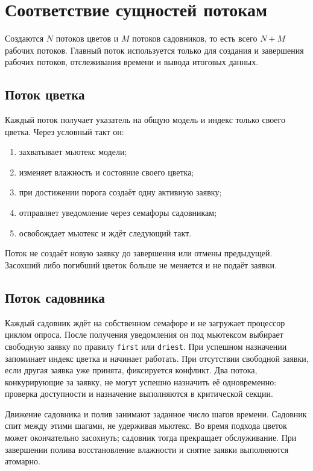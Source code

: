 \documentclass[12pt,a4paper]{article}
\begin{document}
\section{Соответствие сущностей потокам}

Создаются \(N\) потоков цветов и \(M\) потоков садовников, то есть всего
\(N+M\) рабочих потоков. Главный поток используется только для
создания и завершения рабочих потоков, отслеживания времени и вывода
итоговых данных.

\subsection{Поток цветка}

Каждый поток получает указатель на общую модель и индекс только
своего цветка. Через условный такт он:
\begin{enumerate}[noitemsep]
\item захватывает мьютекс модели;
\item изменяет влажность и состояние своего цветка;
\item при достижении порога создаёт одну активную заявку;
\item отправляет уведомление через семафоры садовникам;
\item освобождает мьютекс и ждёт следующий такт.
\end{enumerate}

Поток не создаёт новую заявку до завершения или отмены предыдущей.
Засохший либо погибший цветок больше не меняется и не подаёт заявки.

\subsection{Поток садовника}

Каждый садовник ждёт на собственном семафоре и не загружает процессор
циклом опроса. После получения уведомления он под мьютексом выбирает
свободную заявку по правилу \texttt{first} или \texttt{driest}.
При успешном назначении запоминает индекс цветка и начинает работать.
При отсутствии свободной заявки, если другая заявка уже принята,
фиксируется конфликт. Два потока, конкурирующие за заявку, не могут
успешно назначить её одновременно: проверка доступности и назначение
выполняются в критической секции.

Движение садовника и полив занимают заданное число шагов времени.
Садовник спит между этими шагами, не удерживая мьютекс. Во время
подхода цветок может окончательно засохнуть; садовник тогда прекращает
обслуживание. При завершении полива восстановление влажности и снятие
заявки выполняются атомарно.
\end{document}
